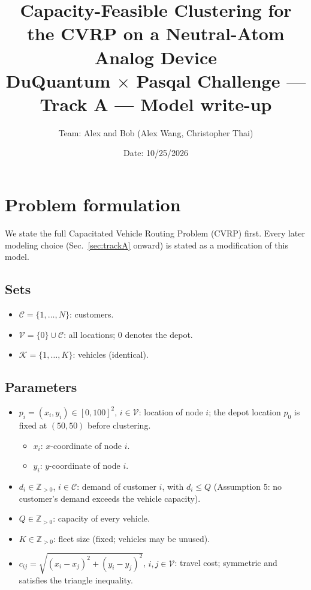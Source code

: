 \documentclass[10pt]{article}
\title{Capacity-Feasible Clustering for the CVRP on a Neutral-Atom Analog Device\\
\large DuQuantum $\times$ Pasqal Challenge --- Track A --- Model write-up}
\author{Team: Alex and Bob (Alex Wang, Christopher Thai)}
\date{Date: 10/25/2026}
\newcommand{\C}{\mathcal{C}}      %
\newcommand{\V}{\mathcal{V}}      %
\newcommand{\K}{\mathcal{K}}      %
\begin{document}
\maketitle

\section{Problem formulation}
\label{sec:formulation}

We state the full Capacitated Vehicle Routing Problem (CVRP) first. Every later modeling choice (Sec.~\ref{sec:trackA} onward) is stated as a modification of this model.

\subsection{Sets}
\begin{itemize}
  \item $\C = \{1,\dots,N\}$: customers.
  \item $\V = \{0\} \cup \C$: all locations; $0$ denotes the depot.
  \item $\K = \{1,\dots,K\}$: vehicles (identical).
\end{itemize}

\subsection{Parameters}
\begin{itemize}
  \item $p_i = (x_i, y_i) \in [0,100]^2$, $i \in \V$: location of node $i$; the depot location $p_0$ is fixed at $(50, 50)$ before clustering.
   \begin{itemize}
        \item $x_i$: $x$-coordinate of node $i$.
        \item $y_i$: $y$-coordinate of node $i$.
    \end{itemize}
  \item $d_i \in \mathbb{Z}_{>0}$, $i \in \C$: demand of customer $i$, with $d_i \le Q$ (Assumption 5: no customer's demand exceeds the vehicle capacity).
  \item $Q \in \mathbb{Z}_{>0}$: capacity of every vehicle.
  \item $K \in \mathbb{Z}_{>0}$: fleet size (fixed; vehicles may be unused).
  \item $c_{ij} = \sqrt{(x_i-x_j)^2+(y_i-y_j)^2}$, $i,j \in \V$: travel cost; symmetric and satisfies the triangle inequality.
\end{itemize}
\end{document}
